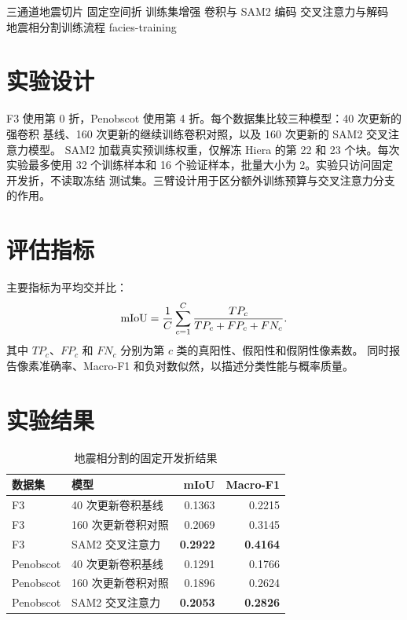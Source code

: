 \TrainingFlow
  {三通道地震切片}
  {固定空间折}
  {训练集增强}
  {卷积与 SAM2 编码}
  {交叉注意力与解码}
  {地震相分割训练流程}
  {facies-training}

\section{实验设计}

F3 使用第 0 折，Penobscot 使用第 4 折。每个数据集比较三种模型：40 次更新的强卷积
基线、160 次更新的继续训练卷积对照，以及 160 次更新的 SAM2 交叉注意力模型。
SAM2 加载真实预训练权重，仅解冻 Hiera 的第 22 和 23 个块。每次实验最多使用
32 个训练样本和 16 个验证样本，批量大小为 2。实验只访问固定开发折，不读取冻结
测试集。三臂设计用于区分额外训练预算与交叉注意力分支的作用。

\section{评估指标}

主要指标为平均交并比：
\begin{equation}
  \mathrm{mIoU}=\frac{1}{C}\sum_{c=1}^{C}
  \frac{TP_c}{TP_c+FP_c+FN_c}.
\end{equation}
其中 $TP_c$、$FP_c$ 和 $FN_c$ 分别为第 $c$ 类的真阳性、假阳性和假阴性像素数。
同时报告像素准确率、Macro-F1 和负对数似然，以描述分类性能与概率质量。

\section{实验结果}

\begin{table}[htbp]
  \centering
  \caption{地震相分割的固定开发折结果}
  \label{tab:facies-dev}
  \begin{tabular}{llrr}
    \toprule
    数据集 & 模型 & mIoU & Macro-F1 \\
    \midrule
    F3 & 40 次更新卷积基线 & 0.1363 & 0.2215 \\
    F3 & 160 次更新卷积对照 & 0.2069 & 0.3145 \\
    F3 & SAM2 交叉注意力 & \textbf{0.2922} & \textbf{0.4164} \\
    \midrule
    Penobscot & 40 次更新卷积基线 & 0.1291 & 0.1766 \\
    Penobscot & 160 次更新卷积对照 & 0.1896 & 0.2624 \\
    Penobscot & SAM2 交叉注意力 & \textbf{0.2053} & \textbf{0.2826} \\
    \bottomrule
  \end{tabular}
\end{table}

